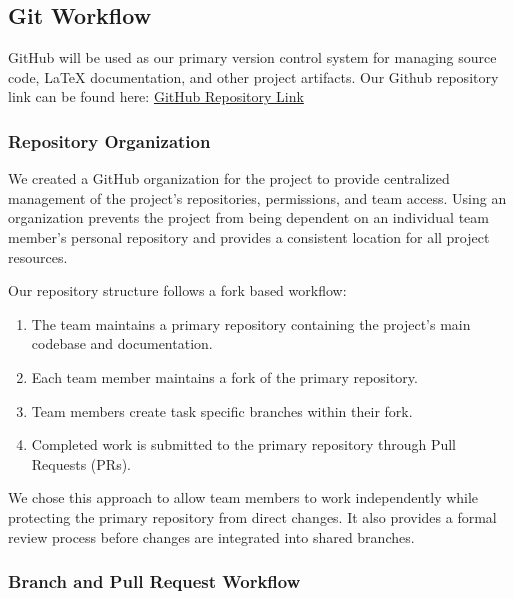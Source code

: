 \documentclass{article}
\begin{document}

\subsection{Git Workflow}

GitHub will be used as our primary version control system for managing source
code, \LaTeX{} documentation, and other project artifacts. Our Github repository link 
can be found here: \href{https://github.com/team-hindsight/ophthamology-game}{GitHub Repository Link}


\subsubsection{Repository Organization}

We created a GitHub organization for the project to provide centralized
management of the project's repositories, permissions, and team access.
Using an organization prevents the project from being dependent on an
individual team member's personal repository and provides a consistent
location for all project resources.

Our repository structure follows a fork based workflow:

\begin{enumerate}
    \item The team maintains a primary repository containing the project's
    main codebase and documentation.

    \item Each team member maintains a fork of the primary repository.

    \item Team members create task specific branches within their fork.

    \item Completed work is submitted to the primary repository through
    Pull Requests (PRs).
\end{enumerate}

We chose this approach to allow team members to work independently while
protecting the primary repository from direct changes. It also provides a
formal review process before changes are integrated into shared branches.


\subsubsection{Branch and Pull Request Workflow}
\end{document}
